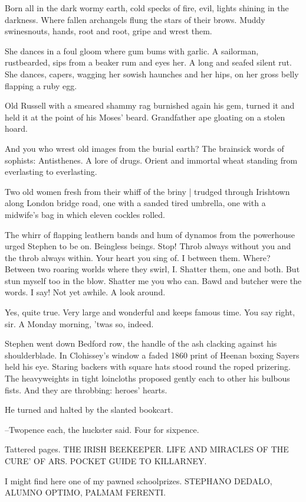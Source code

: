Born all in the dark wormy earth,
cold specks of fire,
evil, lights shining in the darkness.
Where fallen archangels flung the stars of their brows.
Muddy swinesnouts,
hands,
root and root,
gripe and wrest them.

She dances in a foul gloom where gum bums with garlic.
A sailorman, rustbearded, sips from a beaker rum and eyes her.
A long and seafed silent rut.
She dances, capers,
wagging her sowish haunches and her hips,
on her gross belly flapping a ruby egg.

Old Russell with a smeared shammy rag burnished again his gem,
turned it
and held it at the point of his Moses' beard.
Grandfather ape gloating on a stolen hoard.

And you who wrest old images from the burial earth?
The brainsick words of sophists:
Antisthenes.
A lore of drugs.
Orient and immortal wheat
standing from everlasting to everlasting.

Two old women
fresh from their whiff of the briny |
trudged through Irishtown along London bridge road,
one with a sanded tired umbrella,
one with a midwife's bag
in which eleven cockles rolled.

The whirr of flapping leathern bands
and hum of dynamos from the
powerhouse
urged Stephen to be on.
Beingless beings.
Stop!
Throb always
without you and the throb always within.
Your heart you sing of.
I
between them.
Where?
Between two roaring worlds where they swirl, I.
Shatter them, one and both.
But stun myself too in the blow.
Shatter me
you who can.
Bawd and butcher were the words.
I say!
Not yet awhile.
A
look around.

Yes, quite true.
Very large and wonderful and keeps famous time.
You say
right, sir.
A Monday morning, 'twas so, indeed.

Stephen went down Bedford row,
the handle of the ash
clacking against his
shoulderblade.
In Clohissey's window
a faded 1860 print of Heenan boxing
Sayers
held his eye.
Staring backers with square hats
stood round the
roped prizering.
The heavyweights in tight loincloths proposed gently
each to other
his bulbous fists.
And they are throbbing:
heroes' hearts.

He turned and halted by the slanted bookcart.

--Twopence each,
the huckster said.
Four for sixpence.

Tattered pages.
THE IRISH BEEKEEPER.
LIFE AND MIRACLES OF THE CURE' OF
ARS.
POCKET GUIDE TO KILLARNEY.

I might find here one of my pawned schoolprizes.
STEPHANO DEDALO, ALUMNO OPTIMO, PALMAM FERENTI.


